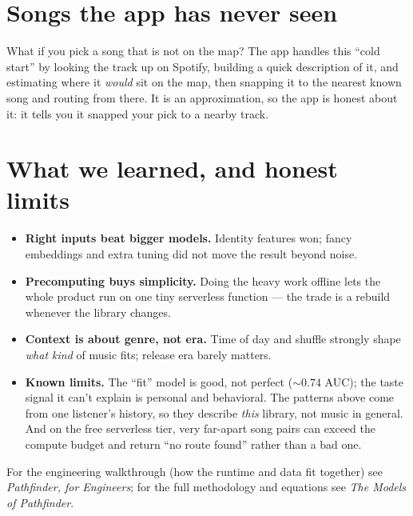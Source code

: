 \documentclass[11pt]{article}
\begin{document}
\section{Songs the app has never seen}
What if you pick a song that is not on the map? The app handles this ``cold start'' by looking the
track up on Spotify, building a quick description of it, and estimating where it \emph{would} sit on
the map, then snapping it to the nearest known song and routing from there. It is an approximation, so
the app is honest about it: it tells you it snapped your pick to a nearby track.

\section{What we learned, and honest limits}
\begin{itemize}[leftmargin=1.4em,itemsep=3pt]
\item \textbf{Right inputs beat bigger models.} Identity features won; fancy embeddings and extra
tuning did not move the result beyond noise.
\item \textbf{Precomputing buys simplicity.} Doing the heavy work offline lets the whole product run
on one tiny serverless function --- the trade is a rebuild whenever the library changes.
\item \textbf{Context is about genre, not era.} Time of day and shuffle strongly shape \emph{what kind}
of music fits; release era barely matters.
\item \textbf{Known limits.} The ``fit'' model is good, not perfect (${\sim}0.74$ AUC); the taste signal
it can't explain is personal and behavioral. The patterns above come from one listener's history, so
they describe \emph{this} library, not music in general. And on the free serverless tier, very
far-apart song pairs can exceed the compute budget and return ``no route found'' rather than a bad
one.
\end{itemize}

For the engineering walkthrough (how the runtime and data fit together) see \emph{Pathfinder, for
Engineers}; for the full methodology and equations see \emph{The Models of Pathfinder}.
\end{document}
